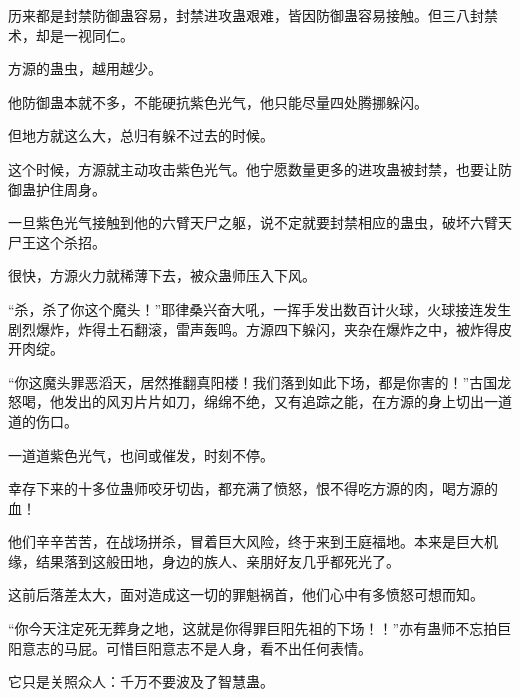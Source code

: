 \begin{this_body}
历来都是封禁防御蛊容易，封禁进攻蛊艰难，皆因防御蛊容易接触。但三八封禁术，却是一视同仁。

方源的蛊虫，越用越少。

他防御蛊本就不多，不能硬抗紫色光气，他只能尽量四处腾挪躲闪。

但地方就这么大，总归有躲不过去的时候。

这个时候，方源就主动攻击紫色光气。他宁愿数量更多的进攻蛊被封禁，也要让防御蛊护住周身。

一旦紫色光气接触到他的六臂天尸之躯，说不定就要封禁相应的蛊虫，破坏六臂天尸王这个杀招。

很快，方源火力就稀薄下去，被众蛊师压入下风。

“杀，杀了你这个魔头！”耶律桑兴奋大吼，一挥手发出数百计火球，火球接连发生剧烈爆炸，炸得土石翻滚，雷声轰鸣。方源四下躲闪，夹杂在爆炸之中，被炸得皮开肉绽。

“你这魔头罪恶滔天，居然推翻真阳楼！我们落到如此下场，都是你害的！”古国龙怒喝，他发出的风刃片片如刀，绵绵不绝，又有追踪之能，在方源的身上切出一道道的伤口。

一道道紫色光气，也间或催发，时刻不停。

幸存下来的十多位蛊师咬牙切齿，都充满了愤怒，恨不得吃方源的肉，喝方源的血！

他们辛辛苦苦，在战场拼杀，冒着巨大风险，终于来到王庭福地。本来是巨大机缘，结果落到这般田地，身边的族人、亲朋好友几乎都死光了。

这前后落差太大，面对造成这一切的罪魁祸首，他们心中有多愤怒可想而知。

“你今天注定死无葬身之地，这就是你得罪巨阳先祖的下场！！”亦有蛊师不忘拍巨阳意志的马屁。可惜巨阳意志不是人身，看不出任何表情。

它只是关照众人：千万不要波及了智慧蛊。

\end{this_body}

